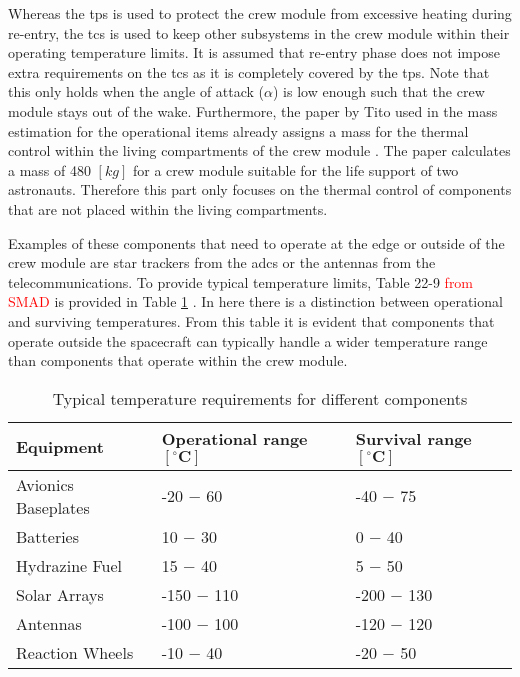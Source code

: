 Whereas the \acrfull{tps} is used to protect the crew module from excessive heating during re-entry, the \acrfull{tcs} is used to keep other subsystems in the crew module within their operating temperature limits. It is assumed that re-entry phase does not impose extra requirements on the \gls{tcs} as it is completely covered by the \gls{tps}. Note that this only holds when the angle of attack ($\alpha$) is low enough such that the crew module stays out of the wake. Furthermore, the paper by Tito used in the mass estimation for the operational items already assigns a mass for the thermal control within the living compartments of the crew module \cite{Tito2013}. The paper calculates a mass of 480 $[kg]$ for a crew module suitable for the life support of two astronauts. Therefore this part only focuses on the thermal control of components that are not placed within the living compartments.

Examples of these components that need to operate at the edge or outside of the crew module are star trackers from the \gls{adcs} or the antennas from the telecommunications. To provide typical temperature limits, Table 22-9 \textcolor{red}{from SMAD} is provided in Table \ref{tab:cmtherm} \cite{Wertz2011}. In here there is a distinction between operational and surviving temperatures. From this table it is evident that components that operate outside the spacecraft can typically handle a wider temperature range than components that operate within the crew module.

\begin{table}[h]
	\centering
	\caption{Typical temperature requirements for different components}
	\begin{tabular}{|l||l|l|}
		\hline
		\textbf{Equipment} & \textbf{Operational range $\mathbf{[^{\circ}C]}$} & \textbf{Survival range $\mathbf{[^{\circ}C]}$}\\ \hline \hline
		Avionics Baseplates & -20 $-$ 60 & -40 $-$ 75 \\
		Batteries & 10 $-$ 30 & 0 $-$ 40 \\
		Hydrazine Fuel & 15 $-$ 40 & 5 $-$ 50 \\
		Solar Arrays & -150 $-$ 110 & -200 $-$ 130 \\
		Antennas & -100 $-$ 100 & -120 $-$ 120 \\
		Reaction Wheels & -10 $-$ 40 & -20 $-$ 50 \\
		\hline
	\end{tabular}
	\label{tab:cmtherm}
\end{table}

